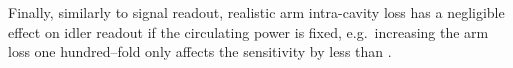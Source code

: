 Finally, similarly to signal readout, realistic arm intra-cavity loss has a negligible effect on idler readout if the circulating power is fixed, e.g.\ increasing the arm loss one hundred--fold only affects the sensitivity by less than . %


